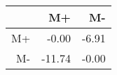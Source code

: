 \begingroup\tiny
\begin{tabular}{rrr}
  \hline
 & M+ & M- \\ 
  \hline
M+ & -0.00 & -6.91 \\ 
  M- & -11.74 & -0.00 \\ 
   \hline
\end{tabular}
\endgroup
